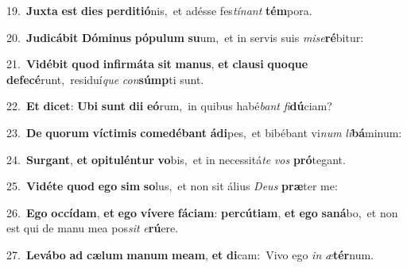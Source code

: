 {{\numbfont\textcolor{\numbcolor}{19.}}~\-\textbf{Jux}\-\textbf{ta} \textbf{est} \textbf{di}\-\textbf{es} \textbf{per}\-\textbf{di}\textbf{ti}\textbf{ó}nis,~\star et adésse fes\-\textit{tí}\-\textit{nant} \textbf{tém}\-pora.\par
{\numbfont\textcolor{\numbcolor}{20.}}~\-\textbf{Ju}\-\textbf{di}\textbf{cá}\textbf{bit} \textbf{Dó}\-\textbf{mi}\textbf{nus} \textbf{pó}\-\textbf{pu}\textbf{lum} \textbf{su}\-um,~\star et in servis suis \textit{mi}\-\textit{se}\textbf{ré}bitur:\par
{\numbfont\textcolor{\numbcolor}{21.}}~\-\textbf{Vi}\-\textbf{dé}\textbf{bit} \textbf{quod} \textbf{in}\-\textbf{fir}\textbf{má}\textbf{ta} \textbf{sit} \textbf{ma}\-\textbf{nus}, \textbf{et} \textbf{clau}\-\textbf{si} \textbf{quo}\-\textbf{que} \textbf{de}\-\textbf{fe}\textbf{cé}runt,~\star residuí\textit{que} \textit{con}\-\textbf{súmp}ti sunt.\par
{\numbfont\textcolor{\numbcolor}{22.}}~\textbf{Et} \textbf{di}\-\textbf{cet}: \textbf{U}\-\textbf{bi} \textbf{sunt} \textbf{di}\-\textbf{i} \textbf{e}\-\textbf{ó}rum,~\star in quibus habé\textit{bant} \textit{fi}\-\textbf{dú}ciam?\par
{\numbfont\textcolor{\numbcolor}{23.}}~\textbf{De} \textbf{quo}\-\textbf{rum} \textbf{víc}\-\textbf{ti}\textbf{mis} \textbf{com}\-\textbf{e}\textbf{dé}\textbf{bant} \textbf{á}\-\textbf{di}pes,~\star et bibébant vi\textit{num} \textit{li}\-\textbf{bá}minum:\par
{\numbfont\textcolor{\numbcolor}{24.}}~\-\textbf{Sur}\-\textbf{gant}, \textbf{et} \textbf{o}\-\textbf{pi}\textbf{tu}\textbf{lén}\textbf{tur} \textbf{vo}\-bis,~\star et in necessitá\textit{te} \textit{vos} \textbf{pró}\-tegant.\par
{\numbfont\textcolor{\numbcolor}{25.}}~\-\textbf{Vi}\-\textbf{dé}\textbf{te} \textbf{quod} \textbf{e}\-\textbf{go} \textbf{sim} \textbf{so}\-lus,~\star et non sit álius \textit{De}\-\textit{us} \textbf{præ}\-ter me:\par
{\numbfont\textcolor{\numbcolor}{26.}}~\-\textbf{E}\-\textbf{go} \textbf{oc}\-\textbf{cí}\textbf{dam}, \textbf{et} \textbf{e}\-\textbf{go} \textbf{ví}\-\textbf{ve}\textbf{re} \textbf{fá}\-\textbf{ci}\textbf{am}: \textbf{per}\-\textbf{cú}\textbf{ti}\textbf{am}, \textbf{et} \textbf{e}\-\textbf{go} \textbf{sa}\-\textbf{ná}bo,~\star et non est qui de manu mea pos\textit{sit} \textit{e}\-\textbf{rú}ere.\par
{\numbfont\textcolor{\numbcolor}{27.}}~\-\textbf{Le}\-\textbf{vá}\textbf{bo} \textbf{ad} \textbf{cæ}\-\textbf{lum} \textbf{ma}\-\textbf{num} \textbf{me}\-\textbf{am}, \textbf{et} \textbf{di}\-cam:~\star Vivo ego \textit{in} \textit{æ}\-\textbf{tér}num.\par
}
